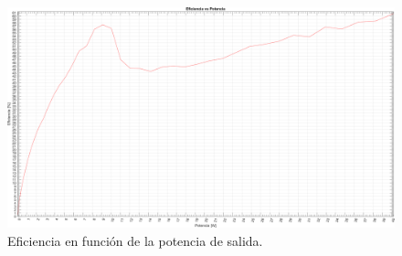 \vfill

\clearpage


\begin{figure}[H]
        \centering
        \includegraphics[height=0.65 \textwidth, angle=90]{./img/simulaciones/Efficiency/Efficiency_vs_power_sim.png}
        \caption{Eficiencia en función de la potencia de salida.}
        \label{fig:efficiency}
\end{figure}